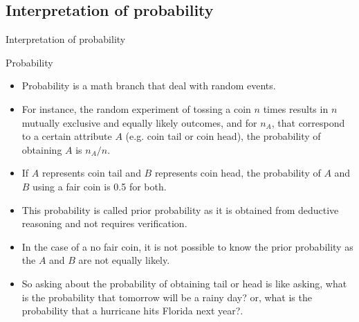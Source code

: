 \documentclass[8pt]{beamer}
\renewcommand{\emph}[1]{\textcolor{myorange}{#1}}
\begin{document}
\subsection{Interpretation of probability}
\begin{frame}{Interpretation of probability}
    \begin{block}{Probability}
        \begin{itemize}
            \item \emph{Probability} is a math branch that deal with random events. 
            \item For instance, the random experiment of tossing a coin $n$ times results in $n$ \emph{mutually exclusive} and \emph{equally likely} outcomes, and for $n_A$, that correspond to a certain attribute $A$ (e.g. coin tail or coin head), the probability of obtaining $A$ is $n_A / n$.
            \item If $A$ represents coin tail and $B$ represents coin head, the probability of $A$ and $B$ using a fair coin is 0.5 for both.
            \item This probability is called \emph{prior probability} as it is obtained from deductive reasoning and not requires verification.
            \item In the case of a no fair coin, it is not possible to know the prior probability as the $A$ and $B$ are not equally likely. 
            \item So asking about the probability of obtaining tail or head is like asking, what is the probability that tomorrow will be a rainy day? or, what is the probability that a hurricane hits Florida next year?. 
        \end{itemize}

    \end{block}
\end{frame}
\end{document}
